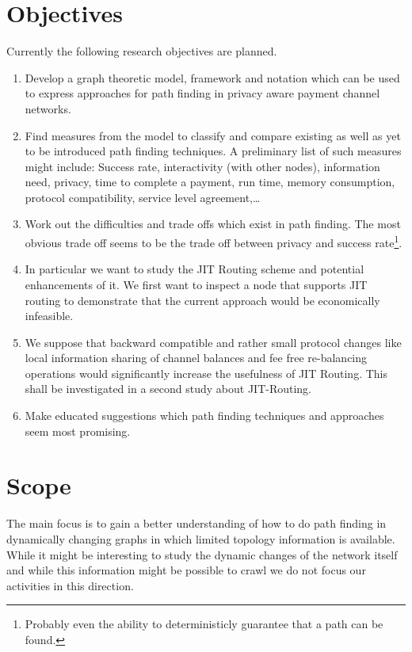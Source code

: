 \documentclass[a4paper]{paper}
\begin{document}
\section{Objectives}
Currently the following research objectives are planned.
\begin{enumerate}
\item Develop a graph theoretic model, framework and notation which can be used to express approaches for path finding in privacy aware payment channel networks.
\item Find measures from the model to classify and compare existing as well as yet to be introduced path finding techniques. A preliminary list of such measures might include: Success rate, interactivity (with other nodes), information need, privacy, time to complete a payment, run time, memory consumption, protocol compatibility, service level agreement,\dots
\item Work out the difficulties and trade offs which exist in path finding. The most obvious trade off seems to be the trade off between privacy and success rate\footnote{Probably even the ability to deterministicly guarantee that a path can be found.}.
\item In particular we want to study the JIT Routing scheme and potential enhancements of it. We first want to inspect a node that supports JIT routing to demonstrate that the current approach would be economically infeasible.
\item We suppose that backward compatible and rather small protocol changes like local information sharing of channel balances and fee free re-balancing operations would significantly increase the usefulness of JIT Routing. This shall be investigated in a second study about JIT-Routing. 
\item Make educated suggestions which path finding techniques and approaches seem most promising.
\end{enumerate}

\section{Scope}
The main focus is to gain a better understanding of how to do path finding in dynamically changing graphs in which limited topology information is available.
While it might be interesting to study the dynamic changes of the network itself and while this information might be possible to crawl we do not focus our activities in this direction.
\end{document}
